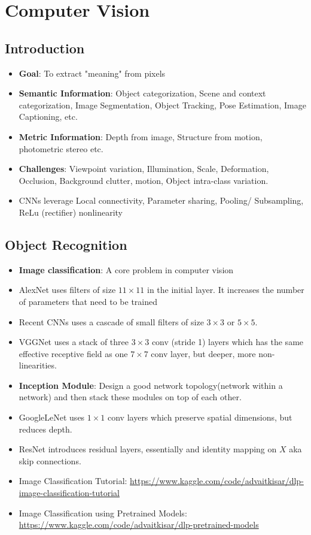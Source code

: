 \documentclass[a4paper]{article}
\begin{document}
\pagebreak
\section{Computer Vision}
\subsection{Introduction}
\begin{itemize}
    \item \textbf{Goal}: To extract "meaning" from pixels
    \item \textbf{Semantic Information}: Object categorization, Scene and context categorization, Image Segmentation, Object Tracking, Pose Estimation, Image Captioning, etc.
    \item \textbf{Metric Information}: Depth from image, Structure from motion, photometric stereo etc.
    \item \textbf{Challenges}: Viewpoint variation, Illumination, Scale, Deformation, Occlusion, Background clutter, motion, Object intra-class variation.
    \item CNNs leverage Local connectivity, Parameter sharing, Pooling/ Subsampling, ReLu (rectifier) nonlinearity
\end{itemize}

\subsection{Object Recognition}
\begin{itemize}
    \item \textbf{Image classification}: A core problem in computer vision
    \item AlexNet uses filters of size $11\times 11$ in the initial layer.  It increases the number of parameters that need to be trained
    \item Recent CNNs uses a cascade of small filters of size $3\times 3$ or $5\times 5$.
    \item VGGNet uses a stack of three $3\times 3$ conv (stride 1) layers which has the same effective receptive field as one $7\times 7$ conv layer, but deeper, more non-linearities.
    \item \textbf{Inception Module}: Design a good network topology(network within a network) and then stack these modules on top of each other.
    \item GoogleLeNet uses $1\times 1$ conv layers which preserve spatial dimensions, but reduces depth.
    \item ResNet introduces residual layers, essentially and identity mapping on $X$ aka skip connections.
    \item Image Classification Tutorial: \url{https://www.kaggle.com/code/advaitkisar/dlp-image-classification-tutorial}
    \item Image Classification using Pretrained Models: \url{https://www.kaggle.com/code/advaitkisar/dlp-pretrained-models}
\end{itemize}
\end{document}

